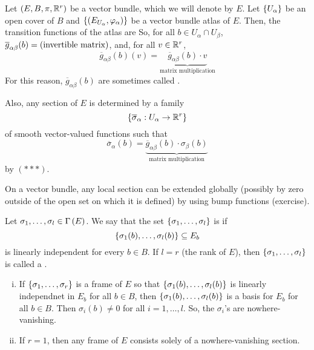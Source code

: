 \documentclass[main.tex]{subfiles}
\begin{document}
 Let $(E, B, \pi, \mathbb{R}^r)$ be a vector bundle, which we will denote by $E$. Let $\left\{U_\alpha\right\}$ be an open cover of $B$ and $\left\{ \left(  E_{U_\alpha}, \varphi_\alpha   \right)\right\}$ be a vector bundle atlas of $E$. Then, the transition functions of the atlas are 
 So, for all $b \in U_\alpha \cap U_\beta$, $\overline{g}_{\alpha\beta}(b) = \left( \text{invertible matrix}  \right)$, and, for all $v \in \mathbb{R}^r$, 
 \[
 \overline{g}_{\alpha\beta}(b)(v) = \underbrace{\overline{g}_{\alpha\beta}(b) \cdot v}_{\text{matrix multiplication}}
 \]
 For this reason, $\overline{g}_{\alpha\beta}(b)$ are sometimes called . 
 
 Also, any section of $E$ is determined by a family \[
 \left\{\overline{\sigma}_\alpha : U_\alpha \to \mathbb{R}^r\right\}
 \]
 of smooth vector-valued functions such that
 \[
 \overline{\sigma}_\alpha(b) = \underbrace{\overline{g}_{\alpha\beta}(b) \cdot \sigma_\beta(b)}_{\text{matrix multiplication}}
 \] by $(***)$.
 
 \begin{note}
 On a vector bundle, any local section can be extended globally (possibly by zero outside of the open set on which it is defined) by using bump functions (exercise).
 \end{note}
 
 \begin{defn}
 Let $\sigma_1, \dots, \sigma_l \in \Gamma\left( E \right)$. We say that the set $\left\{\sigma_1, \dots, \sigma_l\right\}$ is  if 
 \[
 \left\{\sigma_1(b), \dots, \sigma_l(b)\right\} \subseteq E_b
 \] is linearly independent for every $b \in B$. If $l = r$ (the rank of $E$), then $\left\{\sigma_1, \dots, \sigma_l\right\}$ is called a .
 \end{defn}
 
 \begin{note}
 \begin{enumerate}[(i)]
     \item If $\left\{\sigma_1, \dots, \sigma_r \right\}$ is a frame of $E$ so that $\left\{\sigma_1(b),\dots, \sigma_l(b)\right\}$ is linearly independnet in $E_b$ for all $b \in B$, then $\left\{ \sigma_1(b), \dots, \sigma_l(b) \right\}$ is a basis for $E_b$ for all $b \in B$. Then $\sigma_i(b)  \neq 0$ for all $i = 1, \dots, l$. So, the $\sigma_i$'s are nowhere-vanishing.
     \item If $r=1$, then any frame of $E$ consists solely of a nowhere-vanishing section.
 \end{enumerate}
 \end{note}
 
\end{document}
